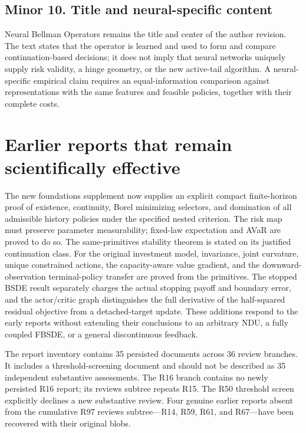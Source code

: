\hypertarget{minor-10.-title-and-neural-specific-content}{%
\subsection{Minor 10. Title and neural-specific content}\label{minor-10.-title-and-neural-specific-content}}

Neural Bellman Operators remains the title and center of the author revision. The text states that the operator is learned and used to form and compare continuation-based decisions; it does not imply that neural networks uniquely supply risk validity, a hinge geometry, or the new active-tail algorithm. A neural-specific empirical claim requires an equal-information comparison against representations with the same features and feasible policies, together with their complete costs.

\hypertarget{earlier-reports-that-remain-scientifically-effective}{%
\section{Earlier reports that remain scientifically effective}\label{earlier-reports-that-remain-scientifically-effective}}

The new foundations supplement now supplies an explicit compact finite-horizon proof of existence, continuity, Borel minimizing selectors, and domination of all admissible history policies under the specified nested criterion. The risk map must preserve parameter measurability; fixed-law expectation and AVaR are proved to do so. The same-primitives stability theorem is stated on its justified continuation class. For the original investment model, invariance, joint curvature, unique constrained actions, the capacity-aware value gradient, and the downward-observation terminal-policy transfer are proved from the primitives. The stopped BSDE result separately charges the actual stopping payoff and boundary error, and the actor/critic graph distinguishes the full derivative of the half-squared residual objective from a detached-target update. These additions respond to the early reports without extending their conclusions to an arbitrary NDU, a fully coupled FBSDE, or a general discontinuous feedback.

The report inventory contains 35 persisted documents across 36 review branches. It includes a threshold-screening document and should not be described as 35 independent substantive assessments. The R16 branch contains no newly persisted R16 report; its reviews subtree repeats R15. The R50 threshold screen explicitly declines a new substantive review. Four genuine earlier reports absent from the cumulative R97 reviews subtree---R14, R59, R61, and R67---have been recovered with their original blobs.

